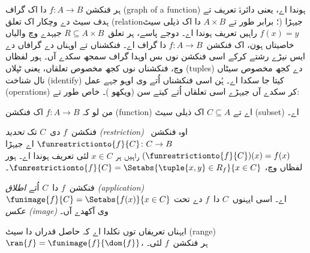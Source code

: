 \documentclass[../../../include/open-logic-section]{subfiles}
\begin{document}
\begin{explain}
ہر فنکشن $f\colon A \to B$ دا اک گراف (graph of a function) ہوندا اے، یعنی دائرۂ تعریف
تے ہدف سیٹ دے وچکار اک تعلق (relation؛ برابر طور تے $A \times B$ دا اک ذیلی سیٹ) جیہڑا
$f(x) = y$ راہیں تعریف ہوندا اے۔ دوجے پاسے، ہر تعلق~$R
\subseteq A \times B$ جیہدے وچ  والیاں
خاصیتاں ہون، اک فنکشن~$f \colon A \to B$ دا گراف اے۔ فنکشناں تے
اوہناں دے گرافاں دے ایس نیڑے رشتے کرکے اسی فنکشن نوں بس اوہدا گراف
سمجھ سکدے آں۔ ہور لفظاں وچ، فنکشناں نوں کجھ مخصوص تعلقاں، یعنی
ٹپلاں (tuples) دے کجھ مخصوص سیٹاں نال شناخت (identify) کیتا جا سکدا اے۔
ہُن اسی فنکشناں اُتے وی اوہو جہے عمل (operations) کر سکدے آں جیہڑے اسی تعلقاں
اُتے کیتے سن (ویکھو )۔ خاص طور تے:
\end{explain}

\begin{defn}
من لو کہ $f \colon A \to B$ اک فنکشن (function) اے تے $C\subseteq A$ اک ذیلی سیٹ (subset) اے۔

فنکشن~$f$ دی~$C$ تک \emph{تحدید (restriction)} اوہ
فنکشن~$\funrestrictionto{f}{C}\colon C \to B$ اے جیہڑا
$(\funrestrictionto{f}{C})(x) = f(x)$ راہیں ہر $x \in C$ لئی
تعریف ہوندا اے۔ ہور لفظاں وچ، $\funrestrictionto{f}{C} =
\Setabs{\tuple{x, y} \in R_f}{x \in C}$۔

فنکشن~$f$ دا~$C$ اُتے \emph{اطلاق (application)} $\funimage{f}{C} =
\Setabs{f(x)}{x \in C}$ اے۔ اسی ایہنوں~$C$ دا~$f$ دے تحت
\emph{عکس (image)} وی آکھدے آں۔
\end{defn}

\begin{explain}
ایہناں تعریفاں توں نکلدا اے کہ حاصل قدراں دا سیٹ (range) $\ran{f} =
\funimage{f}{\dom{f}}$، ہر فنکشن~$f$ لئی۔
\end{explain}
\end{document}
